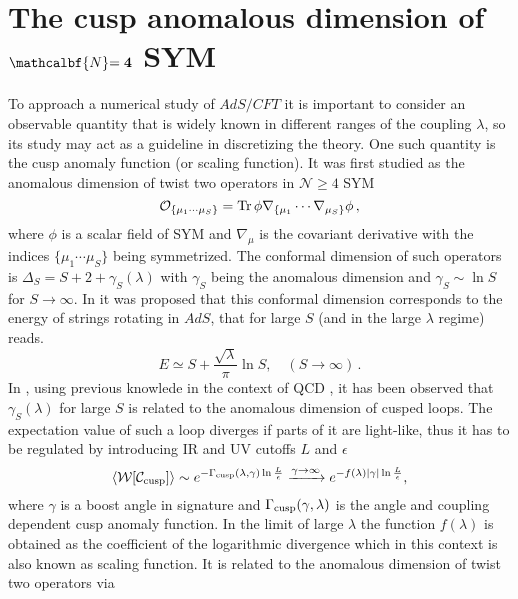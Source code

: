 \section[The cusp anomalous dimension of $\mathcal{N}=4$ SYM]{The cusp anomalous dimension of $\mathcalbf{N} \mathbf{=4}$ SYM}
%
%
To approach a numerical study of $AdS/CFT$ it is important to consider an observable quantity that is widely known in different ranges of the  coupling $\lambda$, so its study may act as a guideline in discretizing the theory. One such quantity is the cusp anomaly function (or scaling function). It was first studied as the anomalous dimension of twist two operators in $\mathcal{N}\geq4$ SYM
%
%
\begin{equation}
\mathcal{O}_{\lbrace \mu_{1}\cdots\mu_{S}\rbrace} = {\rm Tr}\, \phi \nabla_{\lbrace\mu_{1}} \cdots \nabla_{\mu_{S}\rbrace} \phi\,,
\end{equation}
%
%
where $\phi$ is a scalar field of SYM and $\nabla_{\mu}$ is the covariant derivative with the indices $\lbrace \mu_{1} \cdots \mu_{S}\rbrace$ being symmetrized. The conformal dimension of such operators is $\Delta_{S} = S +2 + \gamma_{S}(\lambda)$ with $\gamma_{S}$ being the anomalous dimension and $\gamma_{S} \sim \ln S$ for $S \to \infty$. In \cite{Gubser:2002tv} it was proposed that this conformal dimension corresponds to the energy of strings rotating in $AdS$, that for large $S$ (and in the large $\lambda$ regime) reads.
%
%
\begin{equation}
E \simeq S + \frac{\sqrt{\lambda}}{\pi} \ln S , \quad  (S \to \infty)\,.
\end{equation}
%
%
In \cite{Kruczenski:2002fb}, using previous knowlede in the context of QCD \cite{Korchemsky:1992xv}, it has been observed that $\gamma_{S}(\lambda)$ for large $S$ is related to the anomalous dimension of cusped  loops. The expectation value of such a  loop diverges if parts of it are light-like, thus it has to be regulated by introducing IR and UV cutoffs $L$ and $\epsilon$
%
%
\begin{equation}
\langle \mathcal{W}[\mathcal{C_{\rm cusp}}] \rangle \sim e^{-\Gamma_{\rm cusp}(\lambda,\gamma) \ln\frac{L}{\epsilon}}  \xrightarrow{\gamma \to \infty} e^{-f(\lambda)\vert \gamma\vert \ln \frac{L}{\epsilon}},
\label{W_f}
\end{equation}
%
%
where $\gamma$ is a boost angle in  signature and $\Gamma_{\rm cusp}(\gamma,\lambda)$ is the angle and coupling dependent cusp anomaly function. In the limit of large $\lambda$ the function $f(\lambda)$ is obtained as the coefficient of the logarithmic divergence  which in this context is also known as scaling function. It is related to the anomalous dimension of twist two operators via \cite{Kruczenski:2002fb}
